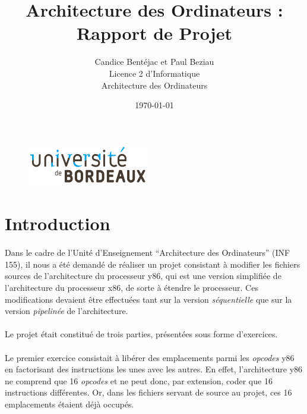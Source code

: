 \documentclass[12pt]{article}
\title{Architecture des Ordinateurs : Rapport de Projet}
\author{Candice Bentéjac et Paul Beziau\\
  Licence 2 d'Informatique\\ 
  Architecture des Ordinateurs}
\date{\today}
\begin{document}
\begin{figure}
  \includegraphics{logo_ub.png}
\end{figure}
\maketitle

\vspace{5\baselineskip}

\newpage

\tableofcontents
\newpage

\section*{Introduction}
\paragraph{}Dans le cadre de l'Unité d'Enseignement ``Architecture des Ordinateurs'' (INF 155), il nous a été demandé de réaliser un projet consistant à modifier les fichiers sources de l'architecture du processeur y86, qui est une version simplifiée de l'architecture du processeur x86, de sorte à étendre le processeur. Ces modifications devaient être effectuées tant sur la version {\itshape séquentielle} que sur la version {\itshape pipelinée} de l'architecture.

\paragraph{}Le projet était constitué de trois parties, présentées sous forme d'exercices.

\paragraph{}Le premier exercice consistait à libérer des emplacements parmi les {\itshape opcodes} y86 en factorisant des instructions les unes avec les autres. En effet, l'architecture y86 ne comprend que 16 {\itshape opcodes} et ne peut donc, par extension, coder que 16 instructions différentes. Or, dans les fichiers servant de source au projet, ces 16 emplacements étaient déjà occupés.
\end{document}
